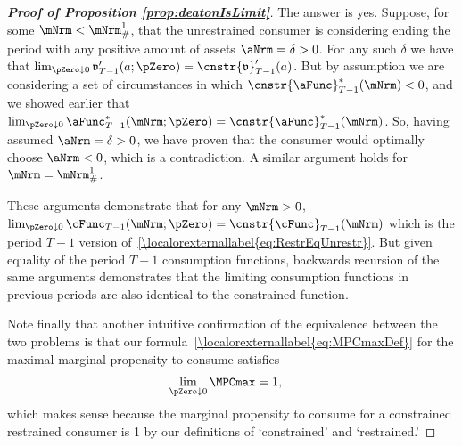 \documentclass[\econtexRoot/BufferStockTheory]{subfiles}
\begin{document}
\begin{proof}[\textbf{Proof of Proposition \ref{prop:deatonIsLimit}}]
The answer is yes.  Suppose, for some $\mNrm < \mNrm^{1}_{\#}$, that the unrestrained consumer is considering ending the period with any positive amount of assets $\aNrm=\delta > 0$.  For any such $\delta$ we have that $\lim_{\pZero \downarrow 0} \mathfrak{v}_{T-1}^{\prime}(a;\pZero)=\cnstr{\mathfrak{v}}_{T-1}^{\prime}(a)$.  But by assumption we are considering a set of circumstances in which $\cnstr{\aFunc}_{T-1}^{*}(\mNrm) < 0$, and we showed earlier that $\lim_{\pZero \downarrow 0} \aFunc_{T-1}^{*}(\mNrm;\pZero) = \cnstr{\aFunc}_{T-1}^{*}(\mNrm)$.  So, having assumed $\aNrm = \delta > 0$, we have proven that the consumer would optimally choose $\aNrm < 0$, which is a contradiction.  A similar argument holds for $\mNrm = \mNrm^{1}_{\#}$.

These arguments demonstrate that for any $\mNrm>0$, $\lim_{\pZero \downarrow 0} \cFunc_{T-1}(\mNrm;\pZero) = \cnstr{\cFunc}_{T-1}(\mNrm)$ which is the period $T-1$ version of~\eqref{\localorexternallabel{eq:RestrEqUnrestr}}.  But given equality of the period $T-1$ consumption functions, backwards recursion of the same arguments demonstrates that the limiting consumption functions in previous periods are also identical to the constrained function.

Note finally that another intuitive confirmation of the equivalence between the two problems is that our formula~\eqref{\localorexternallabel{eq:MPCmaxDef}} for the maximal marginal propensity to consume satisfies
\begin{eqnarray*}
  \lim_{\pZero \downarrow 0} \MPCmax  & = 1,
\end{eqnarray*}
which makes sense because the marginal propensity to consume for a constrained restrained consumer is 1 by our definitions of `constrained' and `restrained.'

\end{proof}

\onlyinsubfile{\pagebreak}
\end{document}
